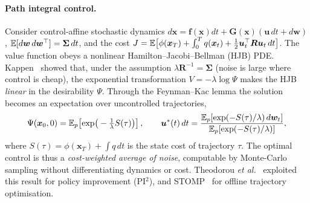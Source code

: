 \paragraph{Path integral control.}
Consider control-affine stochastic dynamics $d\bm{x} = \bm{f}(\bm{x})dt + \bm{G}(\bm{x})(\bm{u}\,dt + d\bm{w})$, $\mathbb{E}[d\bm{w}\,d\bm{w}^\top]=\bm{\Sigma}\,dt$, and the cost $J=\mathbb{E}\big[\phi(\bm{x}_T)+\int_0^T q(\bm{x}_t)+\tfrac12\bm{u}_t^\top\bm{R}\bm{u}_t\,dt\big]$. The value function obeys a nonlinear Hamilton--Jacobi--Bellman (HJB) PDE. Kappen~\cite{kappen2005pathintegrals} showed that, under the assumption $\lambda\bm{R}^{-1}=\bm{\Sigma}$ (noise is large where control is cheap), the exponential transformation $V=-\lambda\log\Psi$ makes the HJB \emph{linear} in the desirability $\Psi$. Through the Feynman--Kac lemma the solution becomes an expectation over uncontrolled trajectories,
\begin{equation}
\Psi(\bm{x}_0,0)=\mathbb{E}_{p}\!\left[\exp\!\big(-\tfrac{1}{\lambda}S(\tau)\big)\right],\qquad
\bm{u}^*(t)\,dt=\frac{\mathbb{E}_{p}\!\left[\exp(-S(\tau)/\lambda)\,d\bm{w}_t\right]}{\mathbb{E}_{p}\!\left[\exp(-S(\tau)/\lambda)\right]},
\label{eq:pi}
\end{equation}
where $S(\tau)=\phi(\bm{x}_T)+\int q\,dt$ is the state cost of trajectory $\tau$. The optimal control is thus a \emph{cost-weighted average of noise}, computable by Monte-Carlo sampling without differentiating dynamics or cost. Theodorou \emph{et al.}~\cite{theodorou2010pi2} exploited this result for policy improvement (PI$^2$), and STOMP~\cite{kalakrishnan2011stomp} for offline trajectory optimisation.

